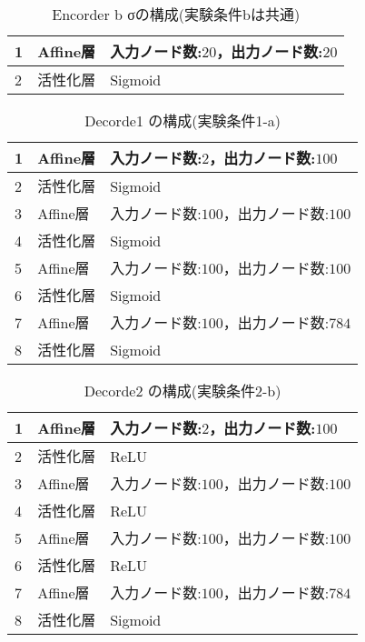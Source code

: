 \documentclass[12pt]{jsarticle}
\begin{document}
\begin{table}[hbt]
\begin{center}
\caption{Encorder b σの構成(実験条件bは共通)}
\label{table:Encorder sigma-1}
\begin{tabularx}{0.9\linewidth}{|l|l|X|}
\hline
1 & Affine層 & 入力ノード数:$20$，出力ノード数:$20$ \\
\hline
2 & 活性化層 & Sigmoid \\
\hline
\end{tabularx}
\end{center}
\end{table}


\begin{table}[hbt]
\begin{center}
\caption{Decorde1 の構成(実験条件1-a)}
\label{table:Decorder}
\begin{tabularx}{0.9\linewidth}{|l|l|X|}
\hline
1 & Affine層 & 入力ノード数:$2$，出力ノード数:$100$ \\
\hline
2 & 活性化層 & Sigmoid \\
\hline
3 & Affine層 & 入力ノード数:$100$，出力ノード数:$100$ \\
\hline
4 & 活性化層 & Sigmoid \\
\hline
5 & Affine層 & 入力ノード数:$100$，出力ノード数:$100$ \\
\hline
6 & 活性化層 & Sigmoid \\
\hline
7 & Affine層 & 入力ノード数:$100$，出力ノード数:$784$ \\
\hline
8 & 活性化層 & Sigmoid \\
\hline

\end{tabularx}
\end{center}
\end{table}

\begin{table}[hbt]
\begin{center}
\caption{Decorde2 の構成(実験条件2-b)}
\label{table:Decorder}
\begin{tabularx}{0.9\linewidth}{|l|l|X|}
  \hline
  1 & Affine層 & 入力ノード数:$2$，出力ノード数:$100$ \\
  \hline
  2 & 活性化層 & ReLU \\
  \hline
  3 & Affine層 & 入力ノード数:$100$，出力ノード数:$100$ \\
  \hline
  4 & 活性化層 & ReLU \\
  \hline
  5 & Affine層 & 入力ノード数:$100$，出力ノード数:$100$ \\
  \hline
  6 & 活性化層 & ReLU \\
  \hline
  7 & Affine層 & 入力ノード数:$100$，出力ノード数:$784$ \\
  \hline
  8 & 活性化層 & Sigmoid \\
  \hline
\end{tabularx}
\end{center}
\end{table}
\end{document}
